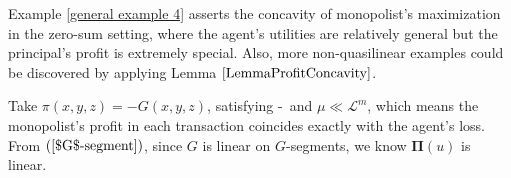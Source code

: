 Example \ref{general example 4} asserts the concavity of monopolist's maximization in the zero-sum setting,
where the agent's utilities are relatively general but the principal's profit is extremely special. Also, more non-quasilinear examples could be discovered by applying Lemma $\ref{LemmaProfitConcavity}$.\medskip



\begin{example}\label{general example 4}
	Take $\pi(x, y, z) = -G(x,y,z)$, satisfying \Gzero-\Gfive\ and $\mu\ll \mathcal{L}^m$, which means the monopolist's profit in each transaction coincides exactly with the 
	agent's loss. From $(\ref{$G$-segment})$, since $G$ is linear on $G$-segments, we know $\pmb \Pi(u)$ is linear.
\end{example}			




